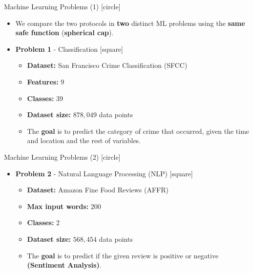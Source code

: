 \begin{frame}{Machine Learning Problems (1)}
    [circle]
    \begin{itemize}
        \item{We compare the two protocols in \textbf{two} distinct ML problems using the \textbf{same safe function} (\textbf{spherical cap}).}
        \vspace{0.3cm}
        \item{\textbf{Problem 1} - Classification
        \vspace{0.1cm}
        [square]
        \begin{itemize}
            \item{\textbf{Dataset:} San Francisco Crime Classification (SFCC)}
            \vspace{0.1cm}
            \item{\textbf{Features:} $9$}
            \vspace{0.1cm}
            \item{\textbf{Classes:} $39$}
            \vspace{0.1cm}
            \item{\textbf{Dataset size:} $878,049$ data points}
            \vspace{0.1cm}
            \item{The \textbf{goal} is to predict the category of crime that occurred, given the time and location and the rest of
            variables.}
        \end{itemize}
        }
    \end{itemize}
\end{frame}

\begin{frame}{Machine Learning Problems (2)}
    [circle]
    \begin{itemize}
        \item{\textbf{Problem 2} - Natural Language Processing (NLP)
        \vspace{0.1cm}
        [square]
        \begin{itemize}
            \item{\textbf{Dataset:} Amazon Fine Food Reviews (AFFR)}
            \vspace{0.2cm}
            \item{\textbf{Max input words:} $200$}
            \vspace{0.2cm}
            \item{\textbf{Classes:} $2$}
            \vspace{0.2cm}
            \item{\textbf{Dataset size:} $568,454$ data points}
            \vspace{0.2cm}
            \item{The \textbf{goal} is to predict if the given review is positive or negative\\\textbf{(Sentiment Analysis)}.}
        \end{itemize}
        }
    \end{itemize}
\end{frame}

